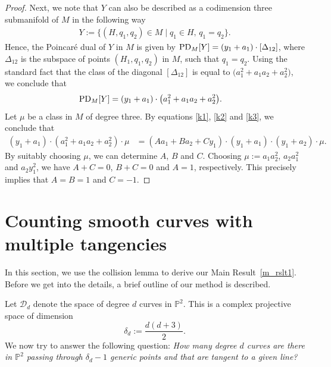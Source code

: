 \documentclass[pdftex]{sigma}
\numberwithin{equation}{section}
\begin{document}
\begin{proof}
Next, we note that $Y$ can also be described as a codimension three submanifold of $M$
in the following way
\begin{align*}
Y:= \{ (H, q_1, q_2) \in M\mid q_1 \in H,\,  q_1 = q_2\}.
\end{align*}
Hence, the Poincar\'{e} dual of $Y$ in $M$ is given by
$
\textnormal{PD}_{M}[Y] = (y_1+a_1)\cdot [\Delta_{12}]$,
where $\Delta_{12}$ is the subspace of points $(H_1, q_1, q_2)$ in $M$, such that
$q_1 = q_2$.
Using the standard fact that the class of the diagonal
$[\Delta_{12}]$ is equal to $\big(a_1^2 + a_1 a_2 + a_2^2\big)$,
we conclude that
\begin{align}
\textnormal{PD}_{M}[Y]& = (y_1+a_1)\cdot \big(a_1^2 + a_1 a_2 + a_2^2\big). \label{k3}
\end{align}
Let $\mu$ be a class in $M$ of degree three. By equations \eqref{k1}, \eqref{k2} and \eqref{k3},
we conclude that
\begin{align*}
(y_1+a_1)\cdot (a_1^2 + a_1 a_2 + a_2^2) \cdot \mu & = (A a_1 + B a_2 + C y_1)\cdot (y_1+a_1)\cdot(y_1+a_2) \cdot \mu.
\end{align*}
By suitably choosing $\mu$, we can determine $A$, $B$ and $C$.
Choosing $\mu := a_1 a_2^2$, $a_2a_1^2$ and $a_2 y_1^2$, we have
$A+C = 0$, $B+C = 0$ and $A = 1$, respectively. This precisely implies that
$A = B = 1$ and $C = -1$.
\end{proof}

\section{Counting smooth curves with multiple tangencies}\label{smooth_tangencies}
\label{smooth_curves_enum}
In this section, we use the collision lemma to derive our Main Result~\ref{m_rslt1}.
Before we get into the details, a brief outline of our method is described.

Let $\mathcal{D}_d$
denote the space of degree $d$ curves in $\mathbb{P}^2$. This is a complex projective space of dimension
\begin{equation}\label{eb}
\delta_d :=  \frac{d(d+3)}{2}.
\end{equation}
We now try to answer the following question:
{\it How many degree $d$ curves are there in $\mathbb{P}^2$ passing through
$\delta_d-1$ generic points and that are tangent to a given line?}
\end{document}
